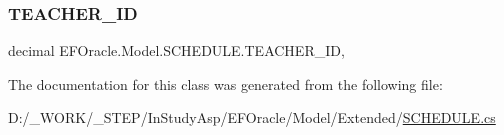 \subsubsection{\texorpdfstring{T\+E\+A\+C\+H\+E\+R\+\_\+\+ID}{TEACHER\_ID}}
{\footnotesize\ttfamily decimal E\+F\+Oracle.\+Model.\+S\+C\+H\+E\+D\+U\+L\+E.\+T\+E\+A\+C\+H\+E\+R\+\_\+\+ID\hspace{0.3cm}{\ttfamily [get]}, {\ttfamily [set]}}



The documentation for this class was generated from the following file\+:\begin{DoxyCompactItemize}
\item 
D\+:/\+\_\+\+W\+O\+R\+K/\+\_\+\+S\+T\+E\+P/\+In\+Study\+Asp/\+E\+F\+Oracle/\+Model/\+Extended/\hyperlink{_extended_2_s_c_h_e_d_u_l_e_8cs}{S\+C\+H\+E\+D\+U\+L\+E.\+cs}\end{DoxyCompactItemize}

